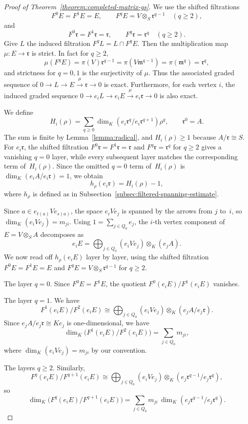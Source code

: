 \documentclass[11pt,letterpaper,reqno]{amsart}
\theoremstyle{definition}
\newcommand{\m}{\mathfrak m}
\newcommand{\rA}{\mathfrak r}
\begin{document}
	\begin{proof}[Proof of Theorem~\ref{theorem:completed-matrix-gs}]
		We use the shifted filtrations
		\[
		F^0E=F^1E=E,
		\qquad
		F^qE=V\otimes_S\rA^{q-1}\quad(q\geq2),
		\]
		and
		\[
		F^0\rA=F^1\rA=\rA,
		\qquad
		F^q\rA=\rA^q\quad(q\geq2).
		\]
		Give $L$ the induced filtration $F^qL=L\cap F^qE$.  Then the multiplication map
		$\mu:E\to\rA$ is strict.  In fact for $q\geq2$,
		\[
		\mu(F^qE)=\pi(V)\rA^{q-1}
		=\pi(V\m^{q-1})=\pi(\m^q)=\rA^q,
		\]
		and strictness for $q=0,1$ is the surjectivity of $\mu$.  Thus the
		associated graded sequence of
		$0\to L\to E\overset{\mu}{\to}\rA\to0$ is exact.
		Furthermore, for each vertex $i$, the induced graded sequence 
$0\to e_iL\to e_iE\overset{\mu}{\to}e_i\rA\to0$ is also exact.

We define
\[
H_i(\rho)=\sum_{q\geq0}
\dim_K(e_i\rA^q/e_i\rA^{q+1})\rho^q,
\qquad \rA^0=A.
\]
The sum is finite by Lemma~\ref{lemma:radical}, and $H_i(\rho)\geq1$
because $A/\rA\cong S$. For $e_i\rA$, the shifted filtration
$F^0\rA=F^1\rA=\rA$ and $F^q\rA=\rA^q$ for $q\geq2$ gives a vanishing
$q=0$ layer, while every subsequent layer matches the corresponding
term of~$H_i(\rho)$.  Since the omitted $q=0$ term of~$H_i(\rho)$ is
$\dim_K(e_iA/e_i\rA)=1$, we obtain
\[h_\rho(e_i\rA)=H_i(\rho)-1,
\]
where $h_\rho$ is defined as in
Subsection~\ref{subsec:filtered-spanning-estimate}.

Since $a\in e_{t(a)}Ve_{s(a)}$, the space $e_iVe_j$ is spanned by the
arrows from $j$ to~$i$, so $\dim_K(e_iVe_j)=m_{ji}$.
Using $1=\sum_{j\in Q_0}e_j$, the $i$-th vertex component of
$E=V\otimes_SA$ decomposes as
\[
 e_iE=\bigoplus_{j\in Q_0}(e_iVe_j)\otimes_K(e_jA).
\]
We now read off $h_\rho(e_iE)$ layer by layer, using the shifted
filtration $F^0E=F^1E=E$ and $F^qE=V\otimes_S\rA^{q-1}$ for $q\geq2$.

The layer $q=0$.
Since $F^0E=F^1E$, the quotient $F^0(e_iE)/F^1(e_iE)$ vanishes.

The layer $q=1$.
We have
\[
 F^1(e_iE)/F^2(e_iE)
 \cong\bigoplus_{j\in Q_0}(e_iVe_j)\otimes_K(e_jA/e_j\rA).
\]
Since 
$e_jA/e_j\rA\cong Ke_j$ is one-dimensional, we have
\[
 \dim_K\bigl(F^1(e_iE)/F^2(e_iE)\bigr)=\sum_{j\in Q_0}m_{ji},
\]
where $\dim_K(e_iVe_j)=m_{ji}$ by our convention.

The layers $q\geq2$.
Similarly,
\[
 F^q(e_iE)/F^{q+1}(e_iE)
 \cong\bigoplus_{j\in Q_0}(e_iVe_j)\otimes_K
       (e_j\rA^{q-1}/e_j\rA^q),
\]
so
\[
 \dim_K\bigl(F^q(e_iE)/F^{q+1}(e_iE)\bigr)
 =\sum_{j\in Q_0}m_{ji}\,
   \dim_K(e_j\rA^{q-1}/e_j\rA^q).
\]


\end{proof}
\end{document}
